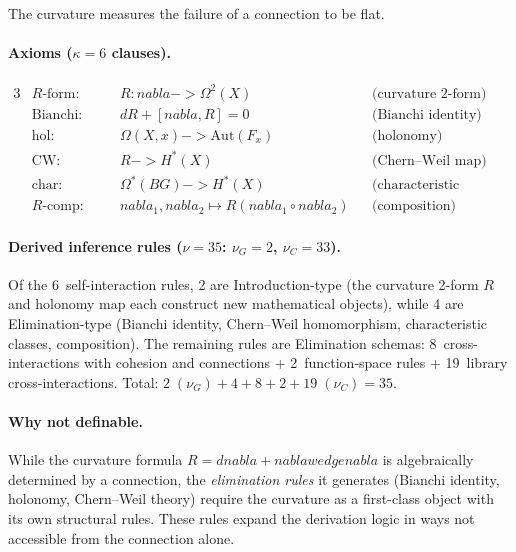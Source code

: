 \documentclass[11pt,a4paper]{article}
\def\to{->}%
\def\nabla{nabla}%
\def\wedge{wedge}%
\theoremstyle{plain}
\theoremstyle{definition}
\theoremstyle{remark}
\begin{document}
The curvature measures the failure of a connection to be flat.

\paragraph{Axioms ($\kappa = 6$ clauses).}
\begin{alignat*}{3}
    &R\text{-form:}             &\quad& R : \nabla \to \Omega^2(X)
        && \text{(curvature 2-form)} \\
    &\mathrm{Bianchi}\text{:}   && dR + [\nabla, R] = 0
        && \text{(Bianchi identity)} \\
    &\mathrm{hol}\text{:}       && \Omega(X, x) \to \mathrm{Aut}(F_x)
        && \text{(holonomy)} \\
    &\mathrm{CW}\text{:}        && R \to H^*(X)
        && \text{(Chern--Weil map)} \\
    &\mathrm{char}\text{:}      && \Omega^*(BG) \to H^*(X)
        && \text{(characteristic classes)} \\
    &R\text{-comp:}             && \nabla_1, \nabla_2 \mapsto R(\nabla_1 \circ \nabla_2)
        && \text{(composition)}
\end{alignat*}

\paragraph{Derived inference rules ($\nu = 35$: $\nu_G = 2$, $\nu_C = 33$).}
Of the 6~self-interaction rules, 2 are Introduction-type (the curvature 2-form $R$ and holonomy map each construct new mathematical objects), while 4 are Elimination-type (Bianchi identity, Chern--Weil homomorphism, characteristic classes, composition).
The remaining rules are Elimination schemas: 8~cross-interactions with cohesion and connections + 2~function-space rules + 19~library cross-interactions.
Total: $2\;(\nu_G) + 4 + 8 + 2 + 19\;(\nu_C) = 35$.

\paragraph{Why not definable.}
While the curvature formula $R = d\nabla + \nabla \wedge \nabla$ is algebraically determined by a connection, the \emph{elimination rules} it generates (Bianchi identity, holonomy, Chern--Weil theory) require the curvature as a first-class object with its own structural rules.
These rules expand the derivation logic in ways not accessible from the connection alone.
\end{document}
